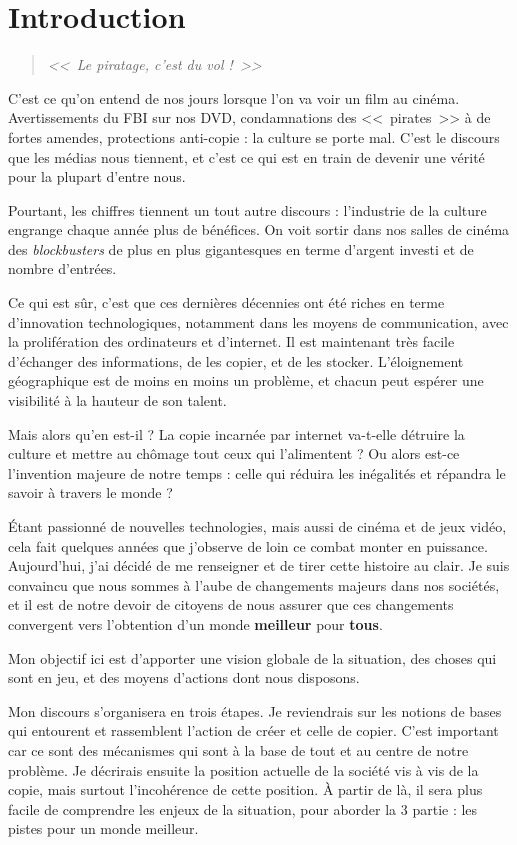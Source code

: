 \chapter*{Introduction}

\begin{quote}
{\Large \textit{<<~Le piratage, c'est du vol !~>>}}
\end{quote}

C'est ce qu'on entend de nos jours lorsque l'on va voir un film au cinéma. Avertissements du FBI sur nos DVD, condamnations des <<~pirates~>> à de fortes amendes, protections anti-copie : la culture se porte mal. C'est le discours que les médias nous tiennent, et c'est ce qui est en train de devenir une vérité pour la plupart d'entre nous.

Pourtant, les chiffres tiennent un tout autre discours : l'industrie de la culture engrange chaque année plus de bénéfices. On voit sortir dans nos salles de cinéma des \textit{blockbusters} de plus en plus gigantesques en terme d'argent investi et de nombre d'entrées.

Ce qui est sûr, c'est que ces dernières décennies ont été riches en terme d'innovation technologiques, notamment dans les moyens de communication, avec la prolifération des ordinateurs et d'internet. Il est maintenant très facile d'échanger des informations, de les copier, et de les stocker. L'éloignement géographique est de moins en moins un problème, et chacun peut espérer une visibilité à la hauteur de son talent.

Mais alors qu'en est-il ? La copie incarnée par internet va-t-elle détruire la culture et mettre au chômage tout ceux qui l'alimentent ? Ou alors est-ce l'invention majeure de notre temps : celle qui réduira les inégalités et répandra le savoir à travers le monde ?

Étant passionné de nouvelles technologies, mais aussi de cinéma et de jeux vidéo, cela fait quelques années que j'observe de loin ce combat monter en puissance. Aujourd'hui, j'ai décidé de me renseigner et de tirer cette histoire au clair. Je suis convaincu que nous sommes à l'aube de changements majeurs dans nos sociétés, et il est de notre devoir de citoyens de nous assurer que ces changements convergent vers l'obtention d'un monde \textbf{meilleur} pour \textbf{tous}.

Mon objectif ici est d'apporter une vision globale de la situation, des choses qui sont en jeu, et des moyens d'actions dont nous disposons.

Mon discours s'organisera en trois étapes. Je reviendrais sur les notions de bases qui entourent et rassemblent l'action de créer et celle de copier. C'est important car ce sont des mécanismes qui sont à la base de tout et au centre de notre problème. Je décrirais ensuite la position actuelle de la société vis à vis de la copie, mais surtout l'incohérence de cette position. À partir de là, il sera plus facile de comprendre les enjeux de la situation, pour aborder la 3\ieme{} partie : les pistes pour un monde meilleur.
